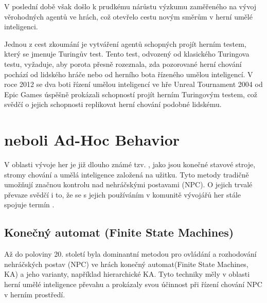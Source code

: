 \newpage

V poslední době však došlo k prudkému nárůstu výzkumu zaměřeného na vývoj věrohodných agentů ve hrách, což otevřelo cestu novým směrům v herní umělé inteligenci. 

Jednou z cest zkoumání je vytváření agentů schopných projít herním testem, který se jmenuje Turingův test\cite{OGDD2021}. Tento test, odvozený od klasického Turingova testu, vyžaduje, aby porota přesně rozeznala, zda pozorované herní chování pochází od lidského hráče nebo od herního bota řízeného umělou inteligencí. V roce 2012 se dva boti řízení umělou inteligencí ve hře Unreal Tournament 2004 od Epic Games úspěšně prokázali schopností projít herním Turingovým testem, což svědčí o jejich schopnosti replikovat herní chování podobné lidskému.

\newpage

\section{ neboli Ad-Hoc Behavior}
V oblasti vývoje her je již dlouho známé tzv. , jako jsou konečné stavové stroje, stromy chování a umělá inteligence založená na užitku. Tyto metody tradičně umožňují značnou kontrolu nad nehráčskými postavami (NPC). O jejich trvalé převaze svědčí i to, že se s jejich používáním v komunitě vývojářů her stále spojuje termín .

\subsection{Konečný automat (Finite State Machines)}
Až do poloviny 20. století byla dominantní metodou pro ovládání a rozhodování nehráčských postav (NPC) ve hrách konečný automat(Finite State Machines, KA)\cite{Gill207} a jeho varianty, například hierarchické KA. Tyto techniky měly v oblasti herní umělé inteligence převahu a prokázaly svou účinnost při řízení chování NPC v herním prostředí.

